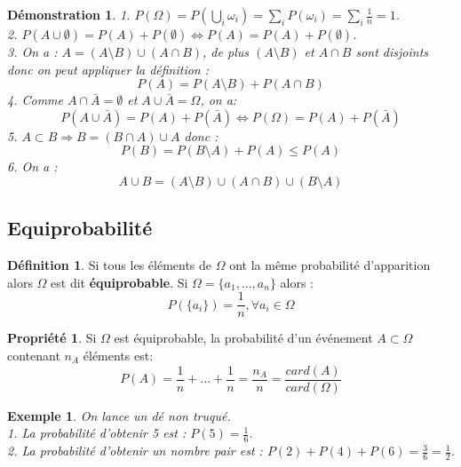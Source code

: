 \documentclass[a4paper,12pt]{article}
\newtheorem{Ex}{Exemple}[section]
\newtheorem{Proof}{Démonstration}[section]
\theoremstyle{theorem}
\theoremstyle{definition}
\newtheorem{Propriete}{Propriété}[section]
\theoremstyle{definition}
\theoremstyle{definition}
\newtheorem{Def}{Définition}[section]
\begin{document}
		\begin{Proof}
			1. $P(\Omega) = P(\bigcup_{i} \omega_{i}) = \sum_{i} P(\omega_{i}) = \sum_{i}\frac{1}{n} = 1$. \\
			2. $P(A\cup \emptyset) = P(A) + P(\emptyset) \iff P(A) = P(A) + P(\emptyset)$. \\
			3. On a : $A = (A\setminus B)\cup (A\cap B)$, de plus $(A\setminus B)$ et $A\cap B$ sont disjoints donc on peut appliquer la définition : 
			\[P(A) = P(A\setminus B) + P(A\cap B)\]
			4. Comme $A\cap \bar{A} = \emptyset$ et $A\cup \bar{A} = \Omega$, on a:
			\[P(A\cup \bar{A}) = P(A) + P(\bar{A}) \iff P(\Omega) = P(A) + P(\bar{A})\]
			5. $A\subset B \Rightarrow B = (B\cap A)\cup A$ donc :
			\[P(B) = P(B\setminus A) + P(A) \leq P(A) \]
			6. On a :
			\[A\cup B = (A\setminus B)\cup (A\cap B)\cup (B\setminus A)\] 
		\end{Proof}
	
	\subsection{Equiprobabilité}
		\begin{Def}
			Si tous les éléments de $\Omega$ ont la même probabilité d'apparition alors $\Omega$ est dit \textbf{équiprobable}. Si $\Omega = \{a_{1},...,a_{n}\}$ alors : 
			\[P(\{a_{i}\}) = \frac{1}{n}, \forall a_{i} \in \Omega \] 
		\end{Def}
	
		\begin{Propriete}
			Si $\Omega$ est équiprobable, la probabilité d'un événement $A\subset \Omega$ contenant $n_{A}$ éléments est:
			\[P(A) = \frac{1}{n} + ... + \frac{1}{n} = \frac{n_{A}}{n} = \frac{card(A)}{card(\Omega)}\]
		\end{Propriete}
	
		\begin{Ex}
			On lance un dé non truqué. \\
			1. La probabilité d'obtenir 5 est : $P(5) = \frac{1}{6}$. \\
			2. La probabilité d'obtenir un nombre pair est : $P(2)+P(4)+P(6) = \frac{3}{6} = \frac{1}{2}$.
		\end{Ex}
		
\end{document}

